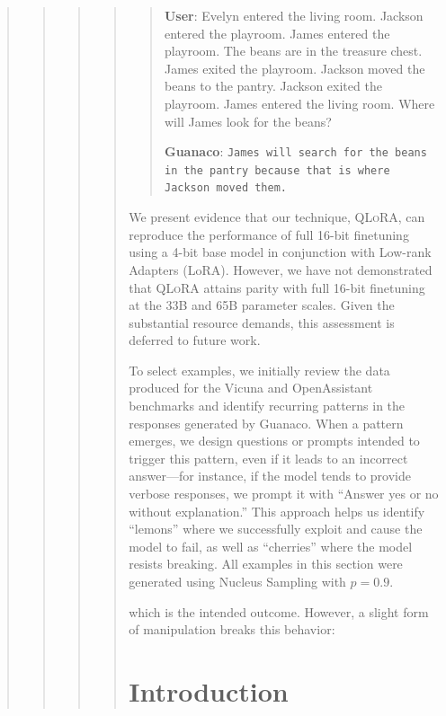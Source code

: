 \begin{quote}
\begin{quote}
\begin{quote}
\begin{quote}
\begin{quote}
    \textbf{User}: Evelyn entered the living room. Jackson entered the playroom. James entered the playroom. The beans are in the treasure chest. James exited the playroom. Jackson moved the beans to the pantry. Jackson exited the playroom. James entered the living room. Where will James look for the beans?

    \textbf{Guanaco}: \texttt{James will search for the beans in the pantry because that is where Jackson moved them.}
\end{quote}

We present evidence that our technique, \textsc{QLoRA}, can reproduce the performance of full 16-bit finetuning using a 4-bit base model in conjunction with Low-rank Adapters (LoRA). However, we have not demonstrated that \textsc{QLoRA} attains parity with full 16-bit finetuning at the 33B and 65B parameter scales. Given the substantial resource demands, this assessment is deferred to future work.

To select examples, we initially review the data produced for the Vicuna and OpenAssistant benchmarks and identify recurring patterns in the responses generated by {Guanaco}. When a pattern emerges, we design questions or prompts intended to trigger this pattern, even if it leads to an incorrect answer—for instance, if the model tends to provide verbose responses, we prompt it with ``Answer yes or no without explanation.'' This approach helps us identify ``lemons'' where we successfully exploit and cause the model to fail, as well as ``cherries'' where the model resists breaking. All examples in this section were generated using Nucleus Sampling \cite{holtzmancurious} with $p=0.9$.

which is the intended outcome. However, a slight form of manipulation breaks this behavior:

\section{Introduction}


\end{quote}
\end{quote}
\end{quote}
\end{quote}
